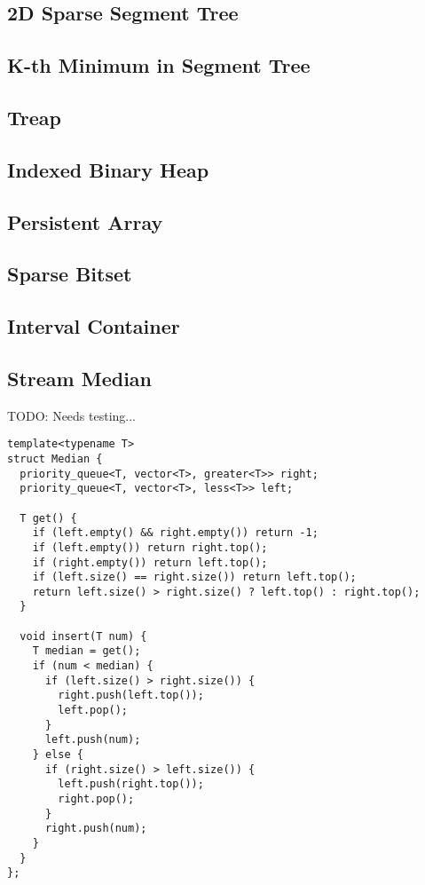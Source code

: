 \subsection{2D Sparse Segment Tree}
\subsection{K-th Minimum in Segment Tree}
\subsection{Treap}
\subsection{Indexed Binary Heap}
\subsection{Persistent Array}
\subsection{Sparse Bitset}
\subsection{Interval Container}
\subsection{Stream Median}

TODO: Needs testing...

\begin{lstlisting}
template<typename T>
struct Median {
  priority_queue<T, vector<T>, greater<T>> right;
  priority_queue<T, vector<T>, less<T>> left;
  
  T get() {
    if (left.empty() && right.empty()) return -1;
    if (left.empty()) return right.top();
    if (right.empty()) return left.top();
    if (left.size() == right.size()) return left.top();
    return left.size() > right.size() ? left.top() : right.top();
  }

  void insert(T num) {
    T median = get();
    if (num < median) {
      if (left.size() > right.size()) {
        right.push(left.top());
        left.pop();
      }
      left.push(num);
    } else {
      if (right.size() > left.size()) {
        left.push(right.top());
        right.pop();
      }
      right.push(num);
    }
  }
};

\end{lstlisting}

